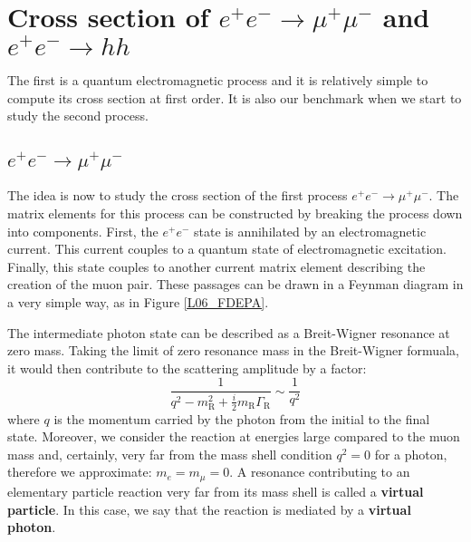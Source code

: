 \documentclass[../../main/main.tex]{subfiles}
\begin{document}
\chapter{Cross section of \( e^+e^- \rightarrow \mu^+\mu^- \) and \( e^+e^- \rightarrow hh \)}


The first is a quantum electromagnetic process and it is relatively simple to compute its cross section at first order. It is also our benchmark when we start to study the second process.





\section{\( e^+e^- \rightarrow \mu^+\mu^- \)}
The idea is now to study the cross section of the first process \( e^+e^- \longrightarrow \mu^+\mu^- \). The matrix elements for this process can be constructed by breaking the process down into components. First, the \( e^+e^- \) state is annihilated by an electromagnetic current. This current couples to a quantum state of electromagnetic excitation. Finally, this state couples to another current matrix element describing the creation of the muon pair. These passages can be drawn in a Feynman diagram in a very simple way, as in Figure \ref{L06_FDEPA}.


The intermediate photon state can be described as a Breit-Wigner resonance at zero mass. Taking the limit of zero resonance mass in the Breit-Wigner formuala, it would then contribute to the scattering amplitude by a factor:
\begin{equation}
	\frac{1}{q^2 - m^2_\mathrm{R} + \frac{i}{2} m_\mathrm{R}\Gamma_\mathrm{R}}
	\sim
	\frac{1}{q^2}
	\label{eq:L06_PAF}
\end{equation}
where \( q \) is the momentum carried by the photon from the initial to the final state. Moreover, we consider the reaction at energies large compared to the muon mass and, certainly, very far from the mass shell condition \( q^2 = 0 \) for a photon, therefore we approximate: \( m_e = m_\mu = 0\). A resonance contributing to an elementary particle reaction very far from its mass shell is called a \textbf{virtual particle}. In this case, we say that the reaction is mediated by a \textbf{virtual photon}.
\end{document}
